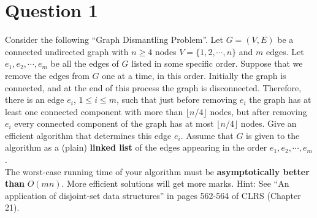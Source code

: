 \documentclass[11pt]{article}
\begin{document}
\section*{Question 1}
Consider the following “Graph Dismantling Problem”. Let $G = (V,E)$ be a
connected undirected graph with $n \geq 4$ nodes $V = \{ 1,2,\cdots,n\}$ and $m$ edges. Let $e_1,e_2,\cdots,e_m$ be all the edges of $G$ listed in some specific order. Suppose that we remove the edges from $G$ one at a time, in this order. Initially the graph is connected, and at the end of this process the graph is disconnected. Therefore, there is an edge $e_i$, $1 \leq i \leq m$, such that just before removing $e_i$ the graph has at least one connected component with more than $\lfloor n/4\rfloor$ nodes, but after removing $e_i$ every connected component of the graph has at most $\lfloor n/4 \rfloor$ nodes. Give an efficient algorithm that determines this edge $e_i$. Assume that $G$ is given to the algorithm as a (plain) \textbf{linked list} of the edges appearing in the order $e_1, e_2,\cdots, e_m$.\\
The worst-case running time of your algorithm must be \textbf{asymptotically better than} $O(mn)$. More efficient solutions will get more marks.
Hint: See “An application of disjoint-set data structures” in pages 562-564 of CLRS (Chapter 21).
\end{document}
